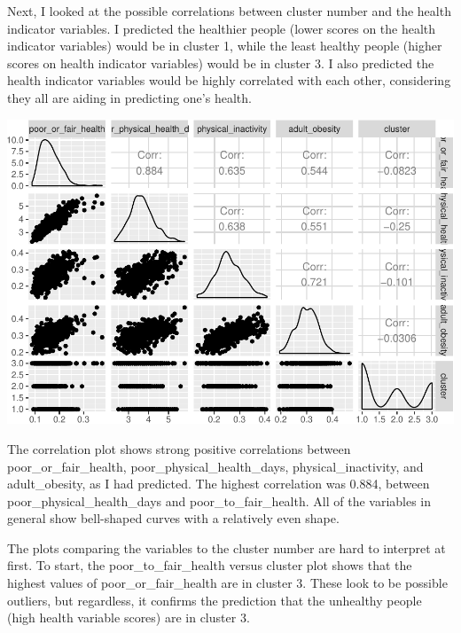 \documentclass[12pt,twoside]{amherstthesis}
\begin{document}
  Next, I looked at the possible correlations between cluster number and
  the health indicator variables. I predicted the healthier people (lower
  scores on the health indicator variables) would be in cluster 1, while
  the least healthy people (higher scores on health indicator variables)
  would be in cluster 3. I also predicted the health indicator variables
  would be highly correlated with each other, considering they all are
  aiding in predicting one's health.
  
  \begin{Shaded}
  \begin{Highlighting}[]
  \end{Highlighting}
  \end{Shaded}
  
  \begin{center}\includegraphics{Comps_Proj_files/figure-latex/unnamed-chunk-16-1} \end{center}
  
  The correlation plot shows strong positive correlations between
  poor\_or\_fair\_health, poor\_physical\_health\_days,
  physical\_inactivity, and adult\_obesity, as I had predicted. The
  highest correlation was 0.884, between poor\_physical\_health\_days and
  poor\_to\_fair\_health. All of the variables in general show bell-shaped
  curves with a relatively even shape.
  
  The plots comparing the variables to the cluster number are hard to
  interpret at first. To start, the poor\_to\_fair\_health versus cluster
  plot shows that the highest values of poor\_or\_fair\_health are in
  cluster 3. These look to be possible outliers, but regardless, it
  confirms the prediction that the unhealthy people (high health variable
  scores) are in cluster 3.
  
\end{document}
